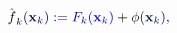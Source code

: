\documentclass[12pt]{article}
\begin{document}
\makeatletter
\renewcommand*{\@textcolor}[3]{%
  \protect\leavevmode
  \begingroup
    \color#1{#2}#3%
  \endgroup
}
\makeatother
\begin{displaymath}
{\mathcolor[RGB]{0,0,15}{\hat { \mathcolor[RGB]{0,0,30}{f} } }} _ { \mathcolor[RGB]{0,0,45}{k} } \mathcolor[RGB]{0,0,60}{(} { \mathcolor[RGB]{0,0,75}{\bf} \mathcolor[RGB]{0,0,90}{x} } _ { \mathcolor[RGB]{0,0,105}{k} } \mathcolor[RGB]{0,0,120}{)} \mathcolor[RGB]{0,0,135}{:} \mathcolor[RGB]{0,0,150}{=} \mathcolor[RGB]{0,0,165}{F} _ { \mathcolor[RGB]{0,0,180}{k} } \mathcolor[RGB]{0,0,195}{(} { \mathcolor[RGB]{0,0,210}{\bf} \mathcolor[RGB]{0,0,225}{x} } _ { \mathcolor[RGB]{0,0,240}{k} } \mathcolor[RGB]{0,0,255}{)} \mathcolor[RGB]{0,15,0}{+} \mathcolor[RGB]{0,15,15}{\phi} \mathcolor[RGB]{0,15,30}{(} { \mathcolor[RGB]{0,15,45}{\bf} \mathcolor[RGB]{0,15,60}{x} } _ { \mathcolor[RGB]{0,15,75}{k} } \mathcolor[RGB]{0,15,90}{)} \mathcolor[RGB]{0,15,105}{,}
\end{displaymath}
\end{document}
